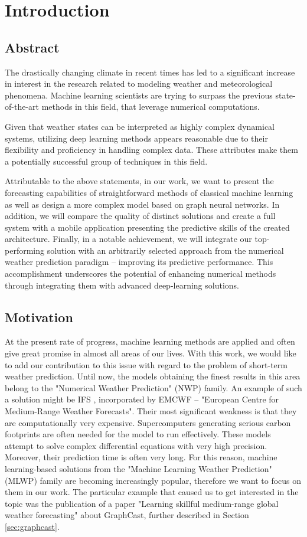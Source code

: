 
\chapter{Introduction}

\section{Abstract}
The drastically changing climate in recent times has led to a significant increase in interest in the research related to modeling weather and meteorological phenomena. Machine learning scientists are trying to surpass the previous state-of-the-art methods in this field, that leverage numerical computations. 

Given that weather states can be interpreted as highly complex dynamical systems, utilizing deep learning methods appears reasonable due to their flexibility and proficiency in handling complex data. These attributes make them a potentially successful group of techniques in this field.

Attributable to the above statements, in our work, we want to present the forecasting capabilities of straightforward methods of classical machine learning as well as design a more complex model based on graph neural networks. In addition, we will compare the quality of distinct solutions and create a full system with a mobile application presenting the predictive skills of the created architecture. Finally, in a notable achievement, we will integrate our top-performing solution with an arbitrarily selected approach from the numerical weather prediction paradigm -- improving its predictive performance. This accomplishment underscores the potential of enhancing numerical methods through integrating them with advanced deep-learning solutions.

\section{Motivation}
At the present rate of progress, machine learning methods are applied and often give great promise in almost all areas of our lives. With this work, we would like to add our contribution to this issue with regard to the problem of short-term weather prediction. Until now, the models obtaining the finest results in this area belong to the "Numerical Weather Prediction" (NWP) family. An example of such a solution might be IFS \cite{ECMWFIFS}, incorporated by EMCWF -- "European Centre for Medium-Range Weather Forecasts". Their most significant weakness is that they are computationally very expensive. Supercomputers generating serious carbon footprints are often needed for the model to run effectively. These models attempt to solve complex differential equations with very high precision. Moreover, their prediction time is often very long. 
For this reason, machine learning-based solutions from the "Machine Learning Weather Prediction" (MLWP) family are becoming increasingly popular, therefore we want to focus on them in our work. The particular example that caused us to get interested in the topic was the publication of a paper "Learning skillful medium-range global weather forecasting" \cite{lam2023graphcast} about GraphCast, further described in Section \ref{sec:graphcast}. 

